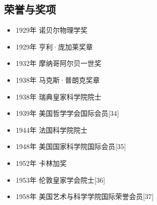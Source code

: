 \subsection{荣誉与奖项}  
\begin{itemize}
\item 1929年 诺贝尔物理学奖  
\item 1929年 亨利·庞加莱奖章  
\item 1932年 摩纳哥阿尔贝一世奖  
\item 1938年 马克斯·普朗克奖章  
\item 1938年 瑞典皇家科学院院士  
\item 1939年 美国哲学学会国际会员[34]  
\item 1944年 法国科学院院士  
\item 1948年 美国国家科学院国际会员[35]  
\item 1952年 卡林加奖  
\item 1953年 伦敦皇家学会院士[36]  
\item 1958年 美国艺术与科学学院国际荣誉会员[37]
\end{itemize}
